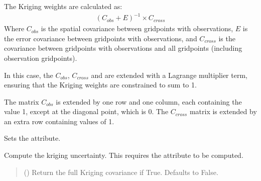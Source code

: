 \documentclass[letterpaper,10pt,english]{sphinxmanual}
\begin{document}
\begin{fulllineitems}
\begin{fulllineitems}
\sphinxAtStartPar
The Kriging weights are calculated as:
\begin{equation*}
\begin{split}(C_{obs} + E)^{-1} \times C_{cross}\end{split}
\end{equation*}
\sphinxAtStartPar
Where \(C_{obs}\) is the spatial covariance between grid\sphinxhyphen{}points
with observations, \(E\) is the error covariance between grid\sphinxhyphen{}points
with observations, and \(C_{cross}\) is the covariance between
grid\sphinxhyphen{}points with observations and all grid\sphinxhyphen{}points (including observation
grid\sphinxhyphen{}points).

\sphinxAtStartPar
In this case, the \(C_{obs}\), \(C_{cross}\) and are extended
with a Lagrange multiplier term, ensuring that the Kriging weights are
constrained to sum to 1.

\sphinxAtStartPar
The matrix \(C_{obs}\) is extended by one row and one column, each
containing the value 1, except at the diagonal point, which is 0. The
\(C_{cross}\) matrix is extended by an extra row containing values
of 1.

\sphinxAtStartPar
Sets the  attribute.
\begin{quote}\begin{description}
\sphinxAtStartPar
{}

\end{description}\end{quote}

\end{fulllineitems}


\begin{fulllineitems}
\label{\detokenize{kriging:glomar_gridding.kriging.OrdinaryKriging.get_uncertainty}}
\pysigstartsignatures
\pysiglinewithargsret
{}
{}
{}
\pysigstopsignatures
\sphinxAtStartPar
Compute the kriging uncertainty. This requires the attribute
 to be computed.
\begin{quote}\begin{description}
\sphinxAtStartPar
{} () \textendash{} Return the full Kriging covariance if True. Defaults to False.


\end{description}
\end{quote}
\end{fulllineitems}
\end{fulllineitems}
\end{document}
